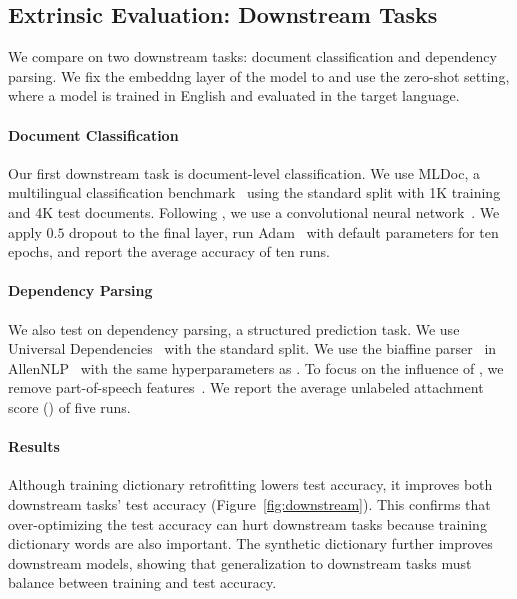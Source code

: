 \subsection{Extrinsic Evaluation: Downstream Tasks}

We compare  on two downstream tasks: document classification and
dependency parsing.
We fix the embeddng layer of the model to  and use the zero-shot
setting, where a model is trained in English and evaluated in the target
language.

\paragraph{Document Classification}
Our first downstream task is document-level classification.
We use MLDoc, a multilingual classification benchmark~\citep{schwenk-18} using the standard split with 1K training and 4K test documents.
Following \citet{glavas-19}, we use a convolutional neural network~\cite{kim-14}.
We apply $0.5$ dropout to the final layer, run Adam~\citep{kingma-15} with default parameters for ten epochs, and
report the average accuracy of ten runs.

\paragraph{Dependency Parsing}
We also test on dependency parsing, a structured prediction task. 
We use Universal Dependencies~\citep[v2.4]{ud2.4} with the standard split.
We use the biaffine parser~\citep{Dozat2017biaffine} in 
AllenNLP~\citep{Gardner2017AllenNLP} with the same hyperparameters as
\citet{ahmad-19}.
To focus on the influence of , we remove part-of-speech features~\citep{ammar-16}.
We report the average unlabeled attachment score () of five runs.

\paragraph{Results}
Although training dictionary retrofitting lowers  test
accuracy, it improves both downstream tasks' test accuracy (Figure~\ref{fig:downstream}).
This confirms that over-optimizing the test  accuracy can hurt
downstream tasks because training dictionary words are also important.
The synthetic dictionary further improves downstream models,
showing that generalization to downstream tasks must balance
between  training and test accuracy.

